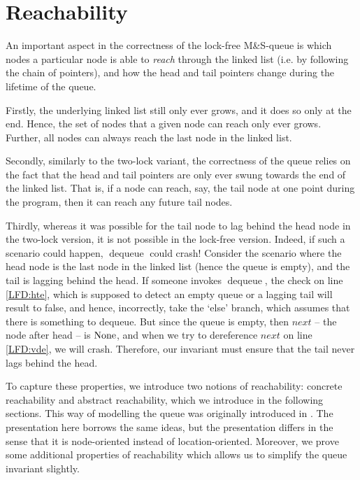 \documentclass[a4paper, 11pt]{report}
\newcommand{\dequeue}{\operatorname{dequeue}}
\begin{document}
\section{Reachability}
\label{LFMSQ:section:reachability}

An important aspect in the correctness of the lock-free M\&S-queue is which nodes a particular node is able to \textit{reach} through the linked list (i.e. by following the chain of pointers), and how the head and tail pointers change during the lifetime of the queue.

Firstly, the underlying linked list still only ever grows, and it does so only at the end. Hence, the set of nodes that a given node can reach only ever grows. Further, all nodes can always reach the last node in the linked list.

Secondly, similarly to the two-lock variant, the correctness of the queue relies on the fact that the head and tail pointers are only ever swung towards the end of the linked list. That is, if a node can reach, say, the tail node at one point during the program, then it can reach any future tail nodes.

Thirdly, whereas it was possible for the tail node to lag behind the head node in the two-lock version, it is not possible in the lock-free version. Indeed, if such a scenario could happen, $\dequeue$ could crash! Consider the scenario where the head node is the last node in the linked list (hence the queue is empty), and the tail is lagging behind the head. If someone invokes $\dequeue$, the check on line \ref{LFD:hte}, which is supposed to detect an empty queue or a lagging tail will result to false, and hence, incorrectly, take the `else' branch, which assumes that there is something to dequeue. But since the queue is empty, then $next$ -- the node after head -- is $\operatorname{None}$, and when we try to dereference $next$ on line \ref{LFD:vde}, we will crash. Therefore, our invariant must ensure that the tail never lags behind the head.

To capture these properties, we introduce two notions of reachability: concrete reachability and abstract reachability, which we introduce in the following sections. This way of modelling the queue was originally introduced in \cite{DBLP:conf/cpp/VindumB21}. The presentation here borrows the same ideas, but the presentation differs in the sense that it is node-oriented instead of location-oriented. Moreover, we prove some additional properties of reachability which allows us to simplify the queue invariant slightly.
\end{document}
